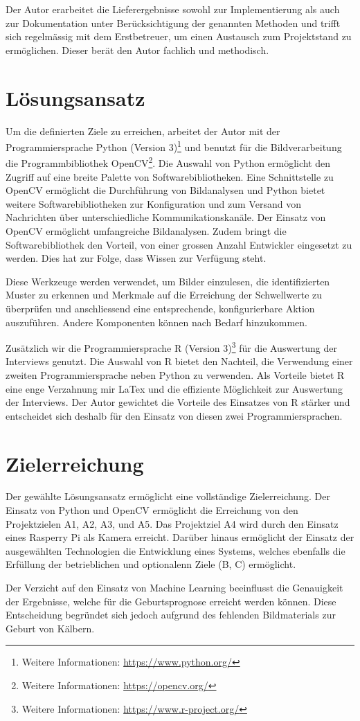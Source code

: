 Der Autor erarbeitet die Lieferergebnisse sowohl zur Implementierung als auch zur Dokumentation unter Berücksichtigung der genannten Methoden und trifft sich regelmässig mit dem Erstbetreuer, um einen Austausch zum Projektstand zu ermöglichen. Dieser berät den Autor fachlich und methodisch.

\section{Lösungsansatz}

Um die definierten Ziele zu erreichen, arbeitet der Autor mit der Programmiersprache Python (Version 3)\footnote{Weitere Informationen: \url{https://www.python.org/}} und benutzt für die Bildverarbeitung die Programmbibliothek OpenCV\footnote{Weitere Informationen: \url{https://opencv.org/}}. Die Auswahl von Python ermöglicht den Zugriff auf eine breite Palette von Softwarebibliotheken. Eine Schnittstelle zu OpenCV ermöglicht die Durchführung von Bildanalysen und Python bietet weitere Softwarebibliotheken zur Konfiguration und zum Versand von Nachrichten über unterschiedliche Kommunikationskanäle. Der Einsatz von OpenCV ermöglicht umfangreiche Bildanalysen. Zudem bringt die Softwarebibliothek den Vorteil, von einer grossen Anzahl Entwickler eingesetzt zu werden. Dies hat zur Folge, dass Wissen zur Verfügung steht. 

Diese Werkzeuge werden verwendet, um Bilder einzulesen, die identifizierten Muster zu erkennen und Merkmale auf die Erreichung der Schwellwerte zu überprüfen und anschliessend eine entsprechende, konfigurierbare Aktion auszuführen. Andere Komponenten können nach Bedarf hinzukommen.

Zusätzlich wir die Programmiersprache R (Version 3)\footnote{Weitere Informationen: \url{https://www.r-project.org/}} für die Auswertung der Interviews genutzt. Die Auswahl von R bietet den Nachteil, die Verwendung einer zweiten Programmiersprache neben Python zu verwenden. Als Vorteile bietet R eine enge Verzahnung mir LaTex und die effiziente Möglichkeit zur Auswertung der Interviews. Der Autor gewichtet die Vorteile des Einsatzes von R stärker und entscheidet sich deshalb für den Einsatz von diesen zwei Programmiersprachen.

\section{Zielerreichung}

Der gewählte Lösungsansatz ermöglicht eine vollständige Zielerreichung. Der Einsatz von Python und OpenCV ermöglicht die Erreichung von den Projektzielen A1, A2, A3, und A5. Das Projektziel A4 wird durch den Einsatz eines Rasperry Pi als Kamera erreicht. Darüber hinaus ermöglicht der Einsatz der ausgewählten Technologien die Entwicklung eines Systems, welches ebenfalls die Erfüllung der betrieblichen und optionalenn Ziele (B, C) ermöglicht.

Der Verzicht auf den Einsatz von Machine Learning beeinflusst die Genauigkeit der Ergebnisse, welche für die Geburtsprognose erreicht werden können. Diese Entscheidung begründet sich jedoch aufgrund des fehlenden Bildmaterials zur Geburt von Kälbern.



